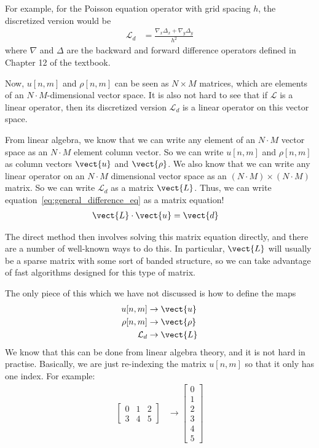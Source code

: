\documentclass[twocolumn]{myarticle}
\newcommand{\mat}[1]{\begin{bmatrix}#1\end{bmatrix}}
\begin{document}
For example, for the Poisson equation operator with grid spacing $ h $, the discretized version would be
\begin{align}
    \mathcal{L}_d &= \frac{\nabla_x \Delta_x + \nabla_y \Delta_y}{h^2}
\end{align}
where $ \nabla $ and $ \Delta $ are the backward and forward difference operators defined in Chapter 12 of the textbook.

Now, $ u[n,m] $ and $ \rho[n,m] $ can be seen as $ N\times M $ matrices, which are elements of an $ N \cdot M $-dimensional vector space.
It is also not hard to see that if $ \mathcal{L} $ is a linear operator, then its discretized version $ \mathcal{L}_d $ is a linear operator on this vector space.

From linear algebra, we know that we can write any element of an $ N \cdot M $ vector space as an $ N\cdot M $ element column vector.
So we can write $ u[n,m] $ and $ \rho[n,m] $ as column vectors $ \vect{u} $ and $ \vect{\rho} $.
We also know that we can write any linear operator on an $ N \cdot M $ dimensional vector space as an $ \left( N \cdot M \right) \times \left( N \cdot M \right) $ matrix.
So we can write $ \mathcal{L}_d $ as a matrix $ \vect{L} $.
Thus, we can write equation~\eqref{eq:general_difference_eq} as a matrix equation!
\begin{align}
    \vect{L} \cdot \vect{u} &= \vect{d}
\end{align}

The direct method then involves solving this matrix equation directly, and there are a number of well-known ways to do this.
In particular, $ \vect{L} $ will usually be a sparse matrix with some sort of banded structure, so we can take advantage of fast algorithms designed for this type of matrix.

The only piece of this which we have not discussed is how to define the maps
\begin{align}
    u[n,m] &\to \vect{u}
    \\
    \rho[n,m] &\to \vect{\rho}
    \\
    \mathcal{L}_d &\to \vect{L}
\end{align}
We know that this can be done from linear algebra theory, and it is not hard in practise.
Basically, we are just re-indexing the matrix $ u[n,m] $ so that it only has one index.
For example:
\begin{align}
    \mat{0 & 1 & 2 \\ 3 & 4 & 5 } &\to \mat{0 \\ 1 \\ 2 \\ 3 \\ 4 \\ 5 }
\end{align}
\end{document}
